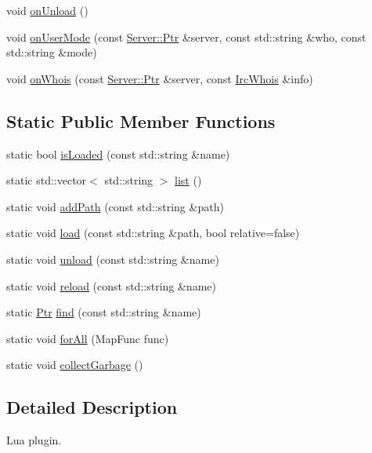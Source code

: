 \begin{DoxyCompactItemize}
\item 
void \hyperlink{a00051_aa6752d68040a78446f3513646f6e7136}{on\-Unload} ()
\item 
void \hyperlink{a00051_a793c75cc7a4149569d7afd91cbdb3260}{on\-User\-Mode} (const \hyperlink{a00055_aea3f9694df81348b909814ac6f84f874}{Server\-::\-Ptr} \&server, const std\-::string \&who, const std\-::string \&mode)
\item 
void \hyperlink{a00051_ad954e639e01948f808cf5652f0dfd2ef}{on\-Whois} (const \hyperlink{a00055_aea3f9694df81348b909814ac6f84f874}{Server\-::\-Ptr} \&server, const \hyperlink{a00036}{Irc\-Whois} \&info)
\end{DoxyCompactItemize}
\subsection*{Static Public Member Functions}
\begin{DoxyCompactItemize}
\item 
static bool \hyperlink{a00051_a247528fc0a94ee986ff2c1236e6f09c3}{is\-Loaded} (const std\-::string \&name)
\item 
static std\-::vector$<$ std\-::string $>$ \hyperlink{a00051_acbb4d3f2e6d76890f6bcbf644b5f1352}{list} ()
\item 
static void \hyperlink{a00051_ad5b200803c9dd1a15b2435eee60de0a2}{add\-Path} (const std\-::string \&path)
\item 
static void \hyperlink{a00051_ab74051a7f21b42cf1f7d0d951121db48}{load} (const std\-::string \&path, bool relative=false)
\item 
static void \hyperlink{a00051_a27f5e33de7dcfc28e17f8d7f206f2131}{unload} (const std\-::string \&name)
\item 
static void \hyperlink{a00051_ad5ed6d542ffa472e4d0d3941c4b5bad7}{reload} (const std\-::string \&name)
\item 
static \hyperlink{a00051_ad981ef3d4a7cd70da4fffb792abcfd7c}{Ptr} \hyperlink{a00051_af1055d03b8af531051791c0461da09d6}{find} (const std\-::string \&name)
\item 
static void \hyperlink{a00051_a835a5624157c28b6c812d5fff3b93e24}{for\-All} (Map\-Func func)
\item 
static void \hyperlink{a00051_afdfa916b9f70d19d26b9f27559259992}{collect\-Garbage} ()
\end{DoxyCompactItemize}


\subsection{Detailed Description}
Lua plugin. 

